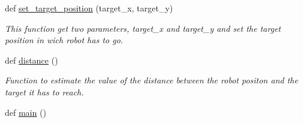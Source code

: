 \begin{DoxyCompactItemize}
def \hyperlink{namespacerobot__user__interface_ac0177573471df46aa7986edba5620184}{set\+\_\+target\+\_\+position} (target\+\_\+x, target\+\_\+y)
\begin{DoxyCompactList}\small\item\em This function get two parameters, target\+\_\+x and target\+\_\+y and set the target position in wich robot has to go. \end{DoxyCompactList}\item 
def \hyperlink{namespacerobot__user__interface_a20558ce4717c6399da8e04e96858203f}{distance} ()
\begin{DoxyCompactList}\small\item\em Function to estimate the value of the distance between the robot positon and the target it has to reach. \end{DoxyCompactList}\item 
def \hyperlink{namespacerobot__user__interface_a6c919b4750dd38ddd929c5e456053de0}{main} ()
\end{DoxyCompactItemize}
